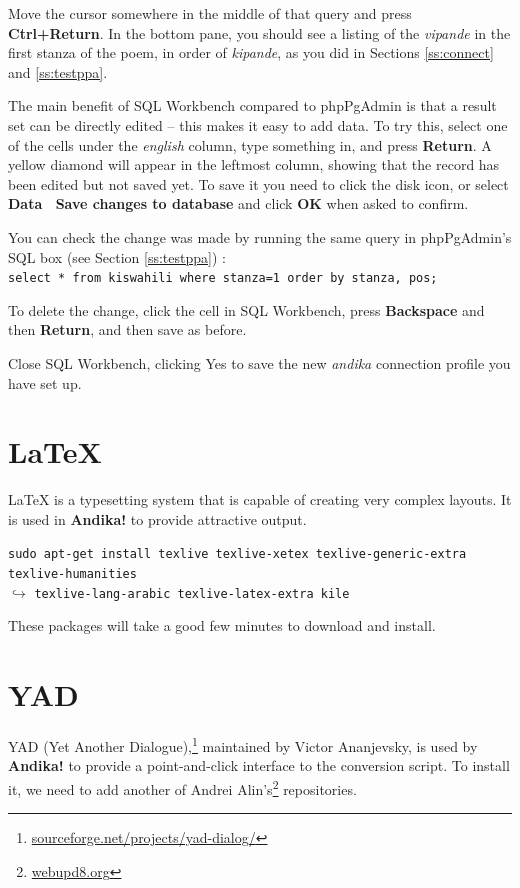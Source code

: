 Move the cursor somewhere in the middle of that query and press \textbf{Ctrl+Return}.  In the bottom pane, you should see a listing of the \textit{vipande} in the first stanza of the poem, in order of \textit{kipande}, as you did in Sections \ref{ss:connect} and \ref{ss:testppa}.

The main benefit of SQL Workbench compared to phpPgAdmin is that a result set can be directly edited -- this makes it easy to add data.  To try this, select one of the cells under the \textit{english} column, type something in, and press \textbf{Return}.  A yellow diamond will appear in the leftmost column, showing that the record has been edited but not saved yet. To save it you need to click the disk icon, or select \textbf{Data \textrightarrow\ Save changes to database} and click \textbf{OK} when asked to confirm.

You can check the change was made by running the same query in phpPgAdmin's SQL box (see Section \ref{ss:testppa}) :\\
\verb|select * from kiswahili where stanza=1 order by stanza, pos;|

To delete the change, click the cell in SQL Workbench, press \textbf{Backspace} and then \textbf{Return}, and then save as before.

Close SQL Workbench, clicking Yes to save the new \textit{andika} connection profile you have set up.


\section{LaTeX}

LaTeX is a typesetting system that is capable of creating very complex layouts.  It is used in \textbf{Andika!} to provide attractive output.

\verb|sudo apt-get install texlive texlive-xetex texlive-generic-extra texlive-humanities|\\
$\hookrightarrow$ \verb|texlive-lang-arabic texlive-latex-extra kile|

These packages will take a good few minutes to download and install.


\section{YAD}

YAD (Yet Another Dialogue),\footnote{\url{sourceforge.net/projects/yad-dialog/}} maintained by Victor Ananjevsky, is used by \textbf{Andika!} to provide a point-and-click interface to the conversion script.  To install it, we need to add another of Andrei Alin's\footnote{\url{webupd8.org}} repositories.

